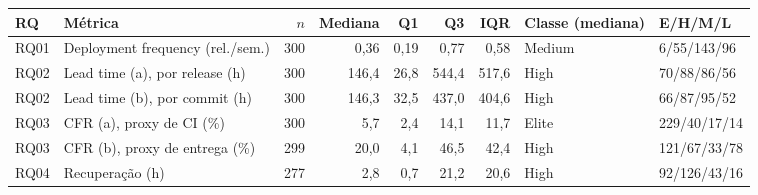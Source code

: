 \begin{tabular}{llrrrrrll}
\hline
RQ & Métrica & $n$ & Mediana & Q1 & Q3 & IQR & Classe (mediana) & E/H/M/L \\ \hline
RQ01 & Deployment frequency (rel./sem.) & 300 & 0{,}36 & 0{,}19 & 0{,}77 & 0{,}58 & Medium & 6/55/143/96 \\
RQ02 & Lead time (a), por release (h) & 300 & 146{,}4 & 26{,}8 & 544{,}4 & 517{,}6 & High & 70/88/86/56 \\
RQ02 & Lead time (b), por commit (h) & 300 & 146{,}3 & 32{,}5 & 437{,}0 & 404{,}6 & High & 66/87/95/52 \\
RQ03 & CFR (a), proxy de CI (\%) & 300 & 5{,}7 & 2{,}4 & 14{,}1 & 11{,}7 & Elite & 229/40/17/14 \\
RQ03 & CFR (b), proxy de entrega (\%) & 299 & 20{,}0 & 4{,}1 & 46{,}5 & 42{,}4 & High & 121/67/33/78 \\
RQ04 & Recuperação (h) & 277 & 2{,}8 & 0{,}7 & 21{,}2 & 20{,}6 & High & 92/126/43/16 \\
\hline
\end{tabular}
